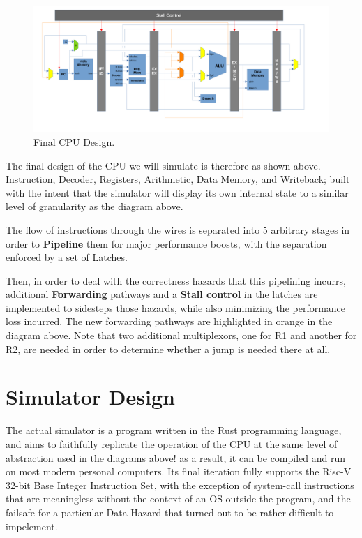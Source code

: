 \documentclass[12pt,twoside]{reedthesis}
\begin{document}
\begin{figure}[h!]

	\centering
	\includegraphics[scale=0.4]{cpu_complete}
	\caption{Final CPU Design.}
	\label{cpu-complete}
\end{figure}

The final design of the CPU we will simulate is therefore as shown above. Instruction, Decoder, Registers, Arithmetic, Data Memory, and Writeback; built with the intent that the simulator will display its own internal state to a similar level of granularity as the diagram above.

The flow of instructions through the wires is separated into 5 arbitrary stages in order to \textbf{Pipeline} them for major performance boosts, with the separation enforced by a set of Latches.

Then, in order to deal with the correctness hazards that this pipelining incurrs, additional \textbf{Forwarding} pathways and a \textbf{Stall control} in the latches are implemented to sidesteps those hazards, while also minimizing the performance loss incurred.
The new forwarding pathways are highlighted in orange in the diagram above. Note that two additional multiplexors, one for R1 and another for R2, are needed in order to determine whether a jump is needed there at all.

\chapter{Simulator Design}

The actual simulator is a program written in the Rust programming language, and aims to faithfully replicate the operation of the CPU at the same level of abstraction used in the diagrams above! as a result, it can be compiled and run on most modern personal computers. Its final iteration fully supports the Risc-V 32-bit Base Integer Instruction Set, with the exception of system-call instructions that are meaningless without the context of an OS outside the program, and the failsafe for a particular Data Hazard that turned out to be rather difficult to impelement.
\end{document}
